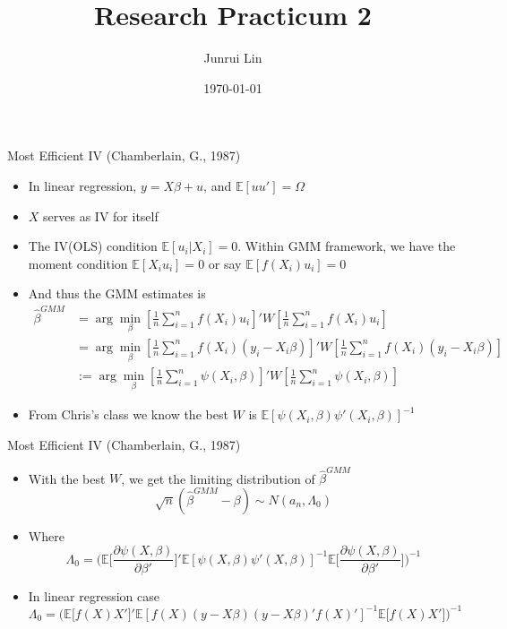 \documentclass[10pt]{beamer}
\title[NYU MSQE]{Research Practicum 2}
\author[Junrui Lin]{Junrui Lin}
\institute[jl12680]{NYU MSQE}
\date[\textcolor{white}{\today} ]
{\today}
\begin{document}
\frame{\titlepage}







\begin{frame}{Most Efficient IV (Chamberlain, G., 1987)}
\begin{itemize}
\item In linear regression, $y=X\beta+u$, and $\mathbb{E}[uu']=\Omega$

\item $X$ serves as IV for itself

\item The IV(OLS) condition $\mathbb{E}[u_i|X_i]=0$. Within GMM framework, we have the moment condition 
  $\mathbb{E}[X_iu_i]=0$ or say $\mathbb{E}[f(X_i)u_i]=0$
  
\item And thus the GMM estimates is \begin{align*}
	\hat\beta^{GMM}&=\arg\min_{\beta} [\frac{1}{n}\sum_{i=1}^nf(X_i)u_i]'W[\frac{1}{n}\sum_{i=1}^nf(X_i)u_i]\\
	&=\arg\min_{\beta} [\frac{1}{n}\sum_{i=1}^nf(X_i)(y_i-X_i\beta)]'W[\frac{1}{n}\sum_{i=1}^nf(X_i)(y_i-X_i\beta)]\\
	&:=\arg\min_{\beta} [\frac{1}{n}\sum_{i=1}^n\psi(X_i,\beta)]'W[\frac{1}{n}\sum_{i=1}^n\psi(X_i,\beta)]	
\end{align*}
\item From Chris's class we know the best $W$ is $\mathbb{E}[\psi(X_i,\beta)\psi '(X_i,\beta)]^{-1}$

\end{itemize}

	
\end{frame}


\begin{frame}{Most Efficient IV (Chamberlain, G., 1987)}
\begin{itemize}
	\item With the best $W$, we get the limiting distribution of $\hat\beta^{GMM}$
	$$\sqrt{n} (\hat\beta^{GMM}-\beta)\sim N(a_n,\Lambda_0)$$
	\item Where $$\Lambda_0 = \bigg(\mathbb{E}\bigg[\frac{\partial\psi(X,\beta)}{\partial \beta'}\bigg]'\mathbb{E}[\psi(X,\beta)\psi '(X,\beta)]^{-1}\mathbb{E}\bigg[\frac{\partial\psi(X,\beta)}{\partial \beta'}\bigg]\bigg)^{-1}$$
	\item In linear regression case
	$$\Lambda_0 = \bigg(\mathbb{E}\bigg[f(X)X'\bigg]'\mathbb{E}[f(X)(y-X\beta)(y-X\beta)'f(X)']^{-1}\mathbb{E}\bigg[f(X)X'\bigg]\bigg)^{-1}$$
\end{itemize}
\end{frame}
\end{document}
